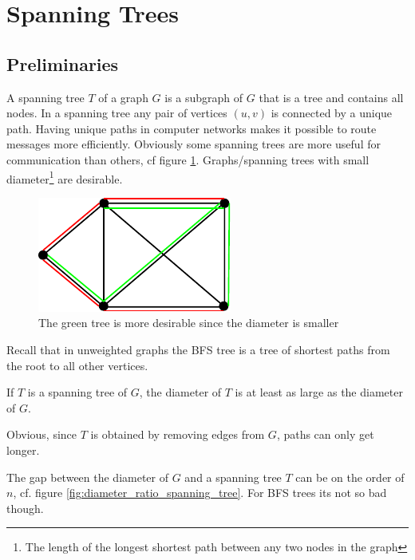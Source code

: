 \section{Spanning Trees}
\subsection{Preliminaries}

A spanning tree $T$ of a graph $G$ is a subgraph of $G$ that is a tree and contains all nodes. In a spanning tree any pair of vertices $(u,v)$ is connected by a unique path. Having unique paths in computer networks makes it possible to route messages more efficiently. Obviously some spanning trees are more useful for communication than others, cf figure \ref{fig:not_all_trees_equal}. Graphs/spanning trees with small diameter\footnote{The length of the longest shortest path between any two nodes in the graph} are desirable.

\begin{figure}[hbt]
\begin{center}
\includegraphics{./images/not_all_trees_equal}
\end{center}
\caption{The green tree is more desirable since the diameter is smaller}
\label{fig:not_all_trees_equal}
\end{figure}

Recall that in unweighted graphs the BFS tree is a tree of shortest paths from the root to all other vertices.

\begin{lem} If $T$ is a spanning tree of $G$, the diameter of $T$ is at least as large as the diameter of $G$.\end{lem}

\begin{pr} Obvious, since $T$ is obtained by removing edges from $G$, paths can only get longer.\end{pr}

The gap between the diameter of $G$ and a spanning tree $T$ can be on the order of $n$, cf. figure \ref{fig:diameter_ratio_spanning_tree}. For BFS trees its not so bad though.

